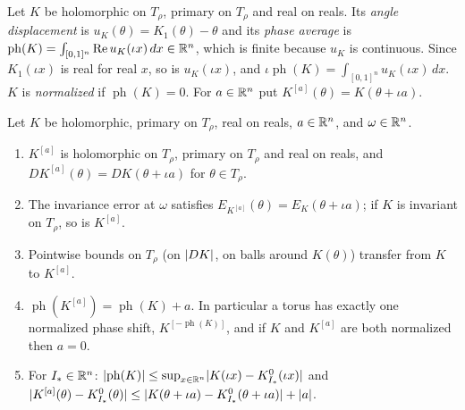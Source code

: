 \begin{definition}\label{bp:p4:phase-average}
Let $K$ be holomorphic on $T_\rho$, primary on $T_\rho$ and real on reals. Its \emph{angle
displacement} is $u_K(\theta)=K_1(\theta)-\theta$ and its \emph{phase average} is
$\operatorname{ph}(K)=\int_{[0,1]^n}\operatorname{Re}u_K(\iota x)\,dx\in\mathbb{R}^n$, which is finite because
$u_K$ is continuous. Since $K_1(\iota x)$ is real for real $x$, so is $u_K(\iota x)$, and
$\iota\operatorname{ph}(K)=\int_{[0,1]^n}u_K(\iota x)\,dx$. $K$ is \emph{normalized} if
$\operatorname{ph}(K)=0$. For $a\in\mathbb{R}^n$ put $K^{[a]}(\theta)=K(\theta+\iota a)$.
\end{definition}

\begin{lemma}\label{bp:p4:shift}
Let $K$ be holomorphic, primary on $T_\rho$, real on reals, $a\in\mathbb{R}^n$, and $\omega\in\mathbb{R}^n$.
\begin{enumerate}[label=(\alph*)]
\item $K^{[a]}$ is holomorphic on $T_\rho$, primary on $T_\rho$ and real on reals, and
  $DK^{[a]}(\theta)=DK(\theta+\iota a)$ for $\theta\in T_\rho$.
\item The invariance error at $\omega$ satisfies $E_{K^{[a]}}(\theta)=E_K(\theta+\iota a)$; if
  $K$ is invariant on $T_\rho$, so is $K^{[a]}$.
\item Pointwise bounds on $T_\rho$ (on $\lvert DK\rvert$, on balls around $K(\theta)$) transfer from $K$ to
  $K^{[a]}$.
\item $\operatorname{ph}(K^{[a]})=\operatorname{ph}(K)+a$. In particular a torus has exactly one
  normalized phase shift, $K^{[-\operatorname{ph}(K)]}$, and if $K$ and $K^{[a]}$ are both
  normalized then $a=0$.
\item For $I_*\in\mathbb{R}^n$: $\lvert \operatorname{ph}(K)\rvert\le\sup_{x\in\mathbb{R}^n}\lvert K(\iota x)-K^0_{I_*}(\iota x)\rvert$
  and $\lvert K^{[a]}(\theta)-K^0_{I_*}(\theta)\rvert\le\lvert K(\theta+\iota a)-K^0_{I_*}(\theta+\iota a)\rvert+\lvert a\rvert$.
\end{enumerate}
\end{lemma}

